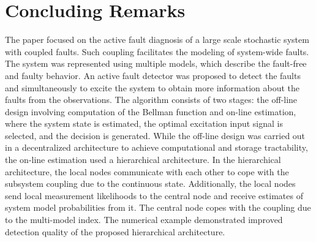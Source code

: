 \documentclass[conference,10pt]{IEEEtran}
\begin{document}
\section{Concluding Remarks}\label{sec:conclusion}
The paper focused on the active fault diagnosis of a large scale stochastic system with coupled faults.
Such coupling facilitates the modeling of system-wide faults.
The system was represented using multiple models, which describe the fault-free and faulty behavior.
An active fault detector was proposed to detect the faults and simultaneously to excite the system to obtain more information about the faults from the observations. 
The algorithm consists of two stages: the off-line design involving computation of the Bellman function and on-line estimation, where the system state is estimated, the optimal excitation input signal is selected, and the decision is generated.
While the off-line design was carried out in a decentralized architecture to achieve computational and storage tractability, the on-line estimation used a hierarchical architecture.
In the hierarchical architecture, the local nodes communicate with each other to cope with the subsystem coupling due to the continuous state.
Additionally, the local nodes send local measurement likelihoods to the central node and receive estimates of system model probabilities from it.
The central node copes with the coupling due to the multi-model index.
The numerical example demonstrated improved detection quality of the proposed hierarchical architecture.



\end{document}
